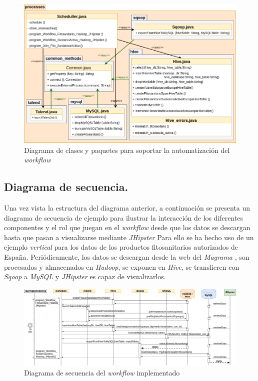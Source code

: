 \begin{figure}[H]
    \centering
    \includegraphics[width=\textwidth,height=\textheight,keepaspectratio]{Imagenes/clases}
    \caption{Diagrama de clases y paquetes para soportar la automatización del \textit{workflow}}
    \label{fig:diag_clases}
\end{figure}

\subsection{Diagrama de secuencia.} \label{disenyo.arquitectura.secuencia}
\par Una vez vista la estructura del diagrama anterior, a continuación se presenta un diagrama de secuencia de ejemplo para ilustrar la interacción de los diferentes componentes y el rol que juegan en el \textit{workflow} desde que los datos se descargan hasta que pasan a visualizarse mediante \textit{JHipster} Para ello se ha hecho uso de un ejemplo \textit{vertical} para los datos de los productos fitosanitarios autorizados de España. Periódicamente, los datos se descargan desde la web del \textit{Magrama} \cite{mapama}, son procesados y almacenados en \textit{Hadoop}, se exponen en \textit{Hive}, se transfieren con \textit{Sqoop} a \textit{MySQL} y \textit{JHipster} es capaz de visualizarlos.

\begin{landscape}
\begin{figure}[p!]
    \includegraphics[width=\linewidth]{Imagenes/secuencia}
    \caption{Diagrama de secuencia del \textit{workflow} implementado}
    \label{fig:diag_secuencia_workflow}
\end{figure}
\end{landscape}
\bigskip


